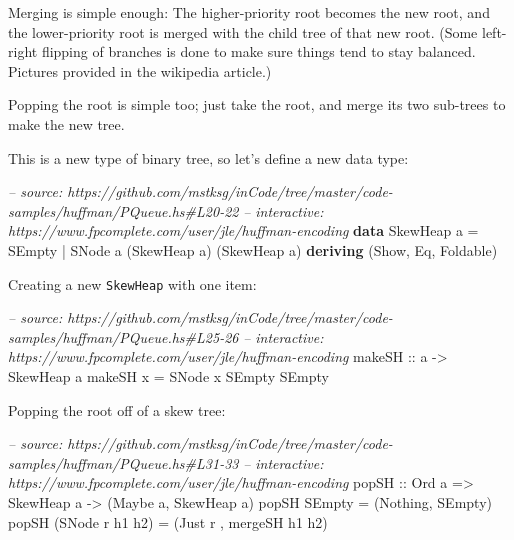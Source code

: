 \documentclass[]{article}
\newenvironment{Shaded}{}{}
\newcommand{\KeywordTok}[1]{\textcolor[rgb]{0.00,0.44,0.13}{\textbf{{#1}}}}
\newcommand{\DataTypeTok}[1]{\textcolor[rgb]{0.56,0.13,0.00}{{#1}}}
\newcommand{\CommentTok}[1]{\textcolor[rgb]{0.38,0.63,0.69}{\textit{{#1}}}}
\newcommand{\OtherTok}[1]{\textcolor[rgb]{0.00,0.44,0.13}{{#1}}}
\newcommand{\FunctionTok}[1]{\textcolor[rgb]{0.02,0.16,0.49}{{#1}}}
\newcommand{\NormalTok}[1]{{#1}}
\begin{document}
Merging is simple enough: The higher-priority root becomes the new root, and the
lower-priority root is merged with the child tree of that new root. (Some
left-right flipping of branches is done to make sure things tend to stay
balanced. Pictures provided in the wikipedia article.)

Popping the root is simple too; just take the root, and merge its two sub-trees
to make the new tree.

This is a new type of binary tree, so let's define a new data type:

\begin{Shaded}
\begin{Highlighting}[]
\CommentTok{-- source: https://github.com/mstksg/inCode/tree/master/code-samples/huffman/PQueue.hs#L20-22}
\CommentTok{-- interactive: https://www.fpcomplete.com/user/jle/huffman-encoding}
\KeywordTok{data} \DataTypeTok{SkewHeap} \NormalTok{a }\FunctionTok{=} \DataTypeTok{SEmpty}
                \FunctionTok{|} \DataTypeTok{SNode} \NormalTok{a (}\DataTypeTok{SkewHeap} \NormalTok{a) (}\DataTypeTok{SkewHeap} \NormalTok{a)}
                \KeywordTok{deriving} \NormalTok{(}\DataTypeTok{Show}\NormalTok{, }\DataTypeTok{Eq}\NormalTok{, }\DataTypeTok{Foldable}\NormalTok{)}
\end{Highlighting}
\end{Shaded}

Creating a new \texttt{SkewHeap} with one item:

\begin{Shaded}
\begin{Highlighting}[]
\CommentTok{-- source: https://github.com/mstksg/inCode/tree/master/code-samples/huffman/PQueue.hs#L25-26}
\CommentTok{-- interactive: https://www.fpcomplete.com/user/jle/huffman-encoding}
\OtherTok{makeSH ::} \NormalTok{a }\OtherTok{->} \DataTypeTok{SkewHeap} \NormalTok{a}
\NormalTok{makeSH x }\FunctionTok{=} \DataTypeTok{SNode} \NormalTok{x }\DataTypeTok{SEmpty} \DataTypeTok{SEmpty}
\end{Highlighting}
\end{Shaded}

Popping the root off of a skew tree:

\begin{Shaded}
\begin{Highlighting}[]
\CommentTok{-- source: https://github.com/mstksg/inCode/tree/master/code-samples/huffman/PQueue.hs#L31-33}
\CommentTok{-- interactive: https://www.fpcomplete.com/user/jle/huffman-encoding}
\OtherTok{popSH ::} \DataTypeTok{Ord} \NormalTok{a }\OtherTok{=>} \DataTypeTok{SkewHeap} \NormalTok{a }\OtherTok{->} \NormalTok{(}\DataTypeTok{Maybe} \NormalTok{a, }\DataTypeTok{SkewHeap} \NormalTok{a)}
\NormalTok{popSH }\DataTypeTok{SEmpty}          \FunctionTok{=} \NormalTok{(}\DataTypeTok{Nothing}\NormalTok{, }\DataTypeTok{SEmpty}\NormalTok{)}
\NormalTok{popSH (}\DataTypeTok{SNode} \NormalTok{r h1 h2) }\FunctionTok{=} \NormalTok{(}\DataTypeTok{Just} \NormalTok{r , mergeSH h1 h2)}
\end{Highlighting}
\end{Shaded}
\end{document}
